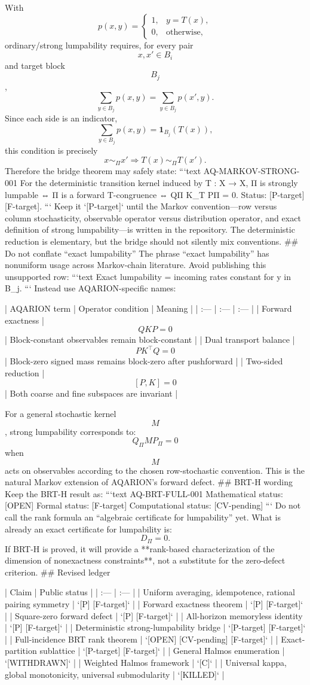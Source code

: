 With
$$
p(x,y)=
\begin{cases}
1,&y=T(x),\\
0,&\text{otherwise},
\end{cases}
$$
ordinary/strong lumpability requires, for every pair $$x,x'\in B_i$$ and target block $$B_j$$,
$$
\sum_{y\in B_j}p(x,y)
=
\sum_{y\in B_j}p(x',y).
$$
Since each side is an indicator,
$$
\sum_{y\in B_j}p(x,y)
=
\mathbf 1_{B_j}(T(x)),
$$
this condition is precisely
$$
x\sim_\Pi x'
\Longrightarrow
T(x)\sim_\Pi T(x').
$$
Therefore the bridge theorem may safely state:
```text
AQ-MARKOV-STRONG-001
For the deterministic transition kernel induced by T : X → X,
Π is strongly lumpable
⇔ Π is a forward T-congruence
⇔ QΠ K_T PΠ = 0.
Status: [P-target] [F-target].
```
Keep it `[P-target]` until the Markov convention—row versus column stochasticity, observable operator versus distribution operator, and exact definition of strong lumpability—is written in the repository. The deterministic reduction is elementary, but the bridge should not silently mix conventions.
## Do not conflate “exact lumpability”
The phrase “exact lumpability” has nonuniform usage across Markov-chain literature. Avoid publishing this unsupported row:
```text
Exact lumpability = incoming rates constant for y in B_j.
```
Instead use AQARION-specific names:

| AQARION term | Operator condition | Meaning |
| :--- | :--- | :--- |
| Forward exactness | $$QKP=0$$ | Block-constant observables remain block-constant |
| Dual transport balance | $$PK^\top Q=0$$ | Block-zero signed mass remains block-zero after pushforward |
| Two-sided reduction | $$[P,K]=0$$ | Both coarse and fine subspaces are invariant |

For a general stochastic kernel $$M$$, strong lumpability corresponds to:
$$
Q_\Pi M P_\Pi=0
$$
when $$M$$ acts on observables according to the chosen row-stochastic convention. This is the natural Markov extension of AQARION’s forward defect.
## BRT-H wording
Keep the BRT-H result as:
```text
AQ-BRT-FULL-001
Mathematical status: [OPEN]
Formal status: [F-target]
Computational status: [CV-pending]
```
Do not call the rank formula an “algebraic certificate for lumpability” yet. What is already an exact certificate for lumpability is:
$$
D_\Pi=0.
$$
If BRT-H is proved, it will provide a **rank-based characterization of the dimension of nonexactness constraints**, not a substitute for the zero-defect criterion.
## Revised ledger

| Claim | Public status |
| :--- | :--- |
| Uniform averaging, idempotence, rational pairing symmetry | `[P] [F-target]` |
| Forward exactness theorem | `[P] [F-target]` |
| Square-zero forward defect | `[P] [F-target]` |
| All-horizon memoryless identity | `[P] [F-target]` |
| Deterministic strong-lumpability bridge | `[P-target] [F-target]` |
| Full-incidence BRT rank theorem | `[OPEN] [CV-pending] [F-target]` |
| Exact-partition sublattice | `[P-target] [F-target]` |
| General Halmos enumeration | `[WITHDRAWN]` |
| Weighted Halmos framework | `[C]` |
| Universal kappa, global monotonicity, universal submodularity | `[KILLED]` |

